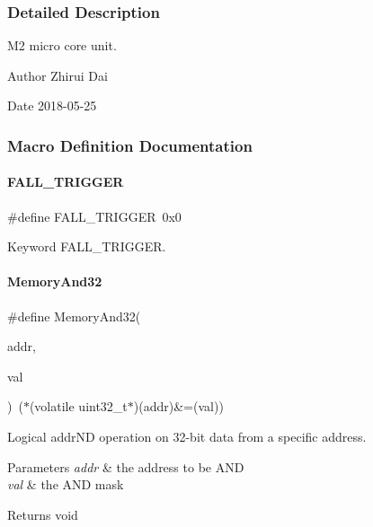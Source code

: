 \subsubsection{Detailed Description}
M2 micro core unit. 

\begin{DoxyAuthor}{Author}
Zhirui Dai 
\end{DoxyAuthor}
\begin{DoxyDate}{Date}
2018-\/05-\/25 
\end{DoxyDate}


\subsubsection{Macro Definition Documentation}
\mbox{\label{a00020_a9bbaf5b9e2125c7597249c7113b20e6c}} 
\paragraph{\texorpdfstring{F\+A\+L\+L\+\_\+\+T\+R\+I\+G\+G\+ER}{FALL\_TRIGGER}}
{\footnotesize\ttfamily \#define F\+A\+L\+L\+\_\+\+T\+R\+I\+G\+G\+ER~0x0}

Keyword F\+A\+L\+L\+\_\+\+T\+R\+I\+G\+G\+ER. \mbox{\label{a00020_ad87cedffcaadc51db22594fce55173d4}} 
\paragraph{\texorpdfstring{Memory\+And32}{MemoryAnd32}}
{\footnotesize\ttfamily \#define Memory\+And32(\begin{DoxyParamCaption}\item[{}]{addr,  }\item[{}]{val }\end{DoxyParamCaption})~($\ast$(volatile uint32\+\_\+t$\ast$)(addr)\&=(val))}



Logical addr\+ND operation on 32-\/bit data from a specific address. 


\begin{DoxyParams}{Parameters}
{\em addr} & the address to be A\+ND \\
\hline
{\em val} & the A\+ND mask \\
\hline
\end{DoxyParams}
\begin{DoxyReturn}{Returns}
void 
\end{DoxyReturn}
\mbox{\label{a00020_afc530c7e6b49b0ca97c1ad9dac1c4750}} 
